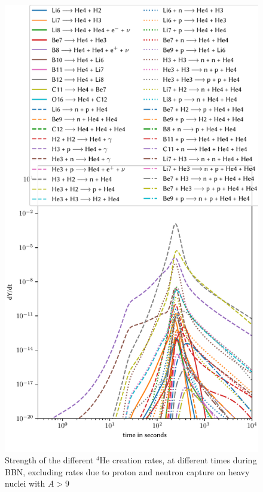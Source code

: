 \begin{figure}[ht]
    \includegraphics[width=5.1in]{figures/app/He4create.pdf}
    \caption{Strength of the different ${}^4$He creation rates, at different times during BBN, excluding rates due to proton and neutron capture on heavy nuclei with $A>9$}
    \label{fig:He4create}
\end{figure}

